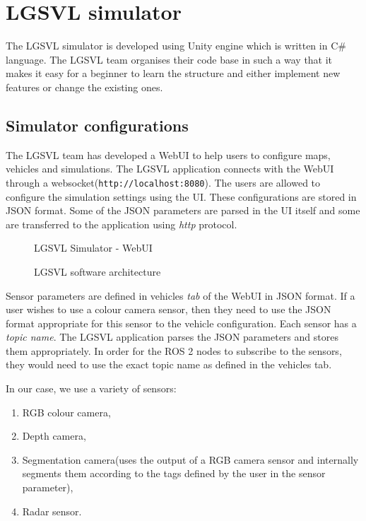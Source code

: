\section{LGSVL simulator}
The LGSVL simulator is developed using Unity engine which is written in C\# language.
The LGSVL team organises their code base\cite{lgsvlgithub} in such a way that it makes it
easy for a beginner to learn the structure and either implement new features or change the
existing ones.

\subsection{Simulator configurations}
The LGSVL team has developed a WebUI to help users to configure maps, vehicles and
simulations. The LGSVL application connects with the WebUI through a
websocket(\texttt{http://localhost:8080}). The users are allowed to configure the
simulation settings using the UI. These configurations are stored in JSON format. Some of the JSON parameters
are parsed in the UI itself and some are transferred to the application using
\textit{http} protocol.

\begin{wrapfigure}{l}{0.4\textwidth}
	\centering
    \def\svgwidth{0.4\textwidth}
    \caption{LGSVL Simulator - WebUI}
    \label{fig:lgsvlwebui}
    \vspace{-15pt}
\end{wrapfigure}

\begin{figure}
	\centering
    \def\svgwidth{0.8\textwidth}
    \caption{LGSVL software architecture}
    \label{fig:lgsvlswarchitecture}
\end{figure}
Sensor parameters are defined in vehicles \textit{tab} of the WebUI in JSON format. If a user wishes to use a colour camera
sensor, then they need to use the JSON format appropriate for this sensor to the vehicle
configuration. Each sensor has a \textit{topic name}. The LGSVL application parses the JSON
parameters and stores them appropriately. In order for the ROS 2 nodes to subscribe to the
sensors, they would need to use the exact topic name as defined in the vehicles tab.

In our case, we use a variety of sensors:
\begin{enumerate}
    \item RGB colour camera,
    \item Depth camera,
    \item Segmentation camera(uses the output of a RGB camera sensor and internally segments them
according to the tags defined by the user in the sensor parameter),
    \item Radar sensor.
\end{enumerate}


